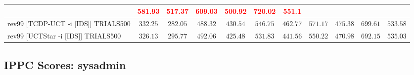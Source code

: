 \documentclass{article}
\begin{document}
\begin{tabular}{|l|r@{$\pm$}rr@{$\pm$}rr@{$\pm$}rr@{$\pm$}rr@{$\pm$}rr@{$\pm$}rr@{$\pm$}rr@{$\pm$}rr@{$\pm$}rr@{$\pm$}r|}
& \multicolumn{2}{c}{\textbf{\textcolor{red}{581.93}}}
& \multicolumn{2}{c}{\textbf{\textcolor{red}{517.37}}}
& \multicolumn{2}{c}{\textbf{\textcolor{red}{609.03}}}
& \multicolumn{2}{c}{\textbf{\textcolor{red}{500.92}}}
& \multicolumn{2}{c}{\textbf{\textcolor{red}{720.02}}}
& \multicolumn{2}{c|}{\textbf{\textcolor{red}{551.1}}}
\\
\hline
rev99 [TCDP-UCT -i [IDS]] TRIALS500
& \multicolumn{2}{c}{$332.25$}
& \multicolumn{2}{c}{$282.05$}
& \multicolumn{2}{c}{$488.32$}
& \multicolumn{2}{c}{$430.54$}
& \multicolumn{2}{c}{$546.75$}
& \multicolumn{2}{c}{$462.77$}
& \multicolumn{2}{c}{$571.17$}
& \multicolumn{2}{c}{$475.38$}
& \multicolumn{2}{c}{$699.61$}
& \multicolumn{2}{c|}{$533.58$}
\\
rev99 [UCTStar -i [IDS]] TRIALS500
& \multicolumn{2}{c}{$326.13$}
& \multicolumn{2}{c}{$295.77$}
& \multicolumn{2}{c}{$492.06$}
& \multicolumn{2}{c}{$425.48$}
& \multicolumn{2}{c}{$531.83$}
& \multicolumn{2}{c}{$441.56$}
& \multicolumn{2}{c}{$550.22$}
& \multicolumn{2}{c}{$470.98$}
& \multicolumn{2}{c}{$692.15$}
& \multicolumn{2}{c|}{$535.03$}
\\
\hline
\end{tabular}%

\bigskip

\subsection*{IPPC Scores: sysadmin}
\end{document}
